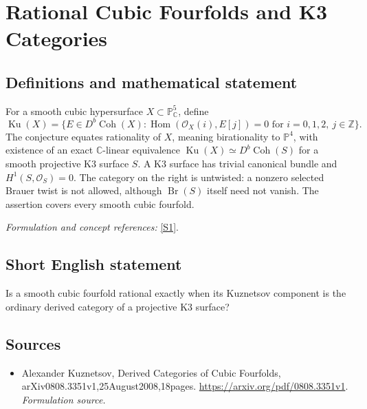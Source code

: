 \documentclass[11pt]{article}
\begin{document}
\section*{\texorpdfstring{Rational Cubic Fourfolds and K3 Categories}{Rational Cubic Fourfolds and K3 Categories}}\label{30004467}
\subsection{Definitions and mathematical statement}
For a smooth cubic hypersurface $X\subset{\mathbb{P}}^5_{{\mathbb{C}}}$, define
\[
 \operatorname{Ku}(X)=\{E\in D^b\operatorname{Coh}(X):
 \operatorname{Hom}(\mathcal O_X(i),E[j])=0\text{ for }i=0,1,2,\ j\in{\mathbb{Z}}\}.
\]
The conjecture equates rationality of $X$, meaning birationality to ${\mathbb{P}}^4$, with existence of an exact ${\mathbb{C}}$-linear equivalence
$\operatorname{Ku}(X)\simeq D^b\operatorname{Coh}(S)$ for a smooth projective K3 surface $S$. A K3 surface has trivial canonical bundle and $H^1(S,\mathcal O_S)=0$. The category on the right is untwisted: a nonzero selected Brauer twist is not allowed, although $\operatorname{Br}(S)$ itself need not vanish. The assertion covers every smooth cubic fourfold.
\par\smallskip\textit{Formulation and concept references:} \href{https://arxiv.org/pdf/0808.3351v1}{[S1]}.

\subsection{Short English statement}
Is a smooth cubic fourfold rational exactly when its Kuznetsov component is the ordinary derived category of a projective K3 surface?
\subsection{Sources}
\begin{itemize}
\item[S1]Alexander Kuznetsov, Derived Categories of Cubic Fourfolds, arXiv0808.3351v1,25August2008,18pages.
\url{https://arxiv.org/pdf/0808.3351v1}.
\textit{Formulation source.}
\end{itemize}
\end{document}
